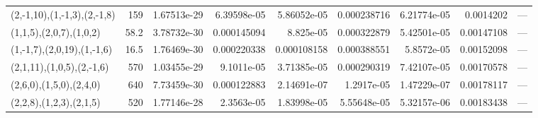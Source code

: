 \begin{tabular}{lrrrrrrrl}
 (2,-1,10),(1,-1,3),(2,-1,8) &  159   & 1.67513e-29 & 6.39598e-05 & 5.86052e-05 &    0.000238716 &  6.21774e-05 & 0.0014202   & ---    \\
 (1,1,5),(2,0,7),(1,0,2)     &   58.2 & 3.78732e-30 & 0.000145094 & 8.825e-05   &    0.000322879 &  5.42501e-05 & 0.00147108  & ---    \\
 (1,-1,7),(2,0,19),(1,-1,6)  &   16.5 & 1.76469e-30 & 0.000220338 & 0.000108158 &    0.000388551 &  5.8572e-05  & 0.00152098  & ---    \\
 (2,1,11),(1,0,5),(2,-1,6)   &  570   & 1.03455e-29 & 9.1011e-05  & 3.71385e-05 &    0.000290319 &  7.42107e-05 & 0.00170578  & ---    \\
 (2,6,0),(1,5,0),(2,4,0)     &  640   & 7.73459e-30 & 0.000122883 & 2.14691e-07 &    1.2917e-05  &  1.47229e-07 & 0.00178117  & ---    \\
 (2,2,8),(1,2,3),(2,1,5)     &  520   & 1.77146e-28 & 2.3563e-05  & 1.83998e-05 &    5.55648e-05 &  5.32157e-06 & 0.00183438  & ---    \\
\hline
\end{tabular}
